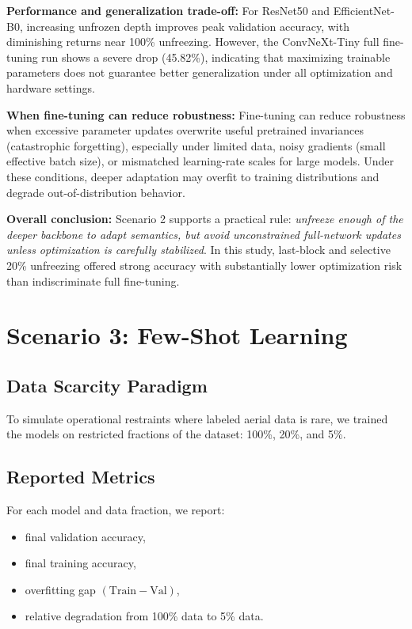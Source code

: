 \documentclass[12pt,a4paper]{article}
\begin{document}
\textbf{Performance and generalization trade-off:}
For ResNet50 and EfficientNet-B0, increasing unfrozen depth improves peak validation accuracy, with diminishing returns near 100\% unfreezing. However, the ConvNeXt-Tiny full fine-tuning run shows a severe drop (45.82\%), indicating that maximizing trainable parameters does not guarantee better generalization under all optimization and hardware settings.

\textbf{When fine-tuning can reduce robustness:}
Fine-tuning can reduce robustness when excessive parameter updates overwrite useful pretrained invariances (catastrophic forgetting), especially under limited data, noisy gradients (small effective batch size), or mismatched learning-rate scales for large models. Under these conditions, deeper adaptation may overfit to training distributions and degrade out-of-distribution behavior.

\textbf{Overall conclusion:}
Scenario 2 supports a practical rule: \textit{unfreeze enough of the deeper backbone to adapt semantics, but avoid unconstrained full-network updates unless optimization is carefully stabilized}. In this study, last-block and selective 20\% unfreezing offered strong accuracy with substantially lower optimization risk than indiscriminate full fine-tuning.


\section{Scenario 3: Few-Shot Learning}
\label{sec:scenario3}

\subsection{Data Scarcity Paradigm}
To simulate operational restraints where labeled aerial data is rare, we trained the models on restricted fractions of the dataset: 100\%, 20\%, and 5\%.

\subsection{Reported Metrics}
For each model and data fraction, we report:
\begin{itemize}[nosep]
    \item final validation accuracy,
    \item final training accuracy,
    \item overfitting gap \((\text{Train} - \text{Val})\),
    \item relative degradation from 100\% data to 5\% data.
\end{itemize}
\end{document}
